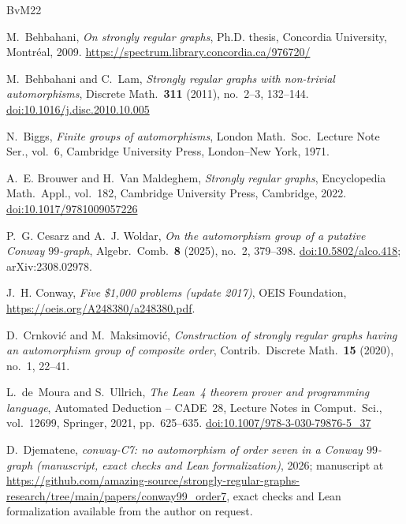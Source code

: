\documentclass[11pt,a4paper]{amsart}
\theoremstyle{definition}
\theoremstyle{remark}
\begin{document}
\begin{thebibliography}{BvM22}

 M.~Behbahani, \emph{On strongly regular graphs}, Ph.D. thesis, Concordia University,
Montréal, 2009. \url{https://spectrum.library.concordia.ca/976720/}

 M.~Behbahani and C.~Lam, \emph{Strongly regular graphs with non-trivial automorphisms},
Discrete Math.\ \textbf{311} (2011), no.~2--3, 132--144.
\href{https://doi.org/10.1016/j.disc.2010.10.005}{doi:10.1016/j.disc.2010.10.005}

 N.~Biggs, \emph{Finite groups of automorphisms}, London Math.\ Soc.\ Lecture Note Ser.,
vol.~6, Cambridge University Press, London--New York, 1971.

 A.~E. Brouwer and H.~Van Maldeghem, \emph{Strongly regular graphs}, Encyclopedia Math.\
Appl., vol.~182, Cambridge University Press, Cambridge, 2022.
\href{https://doi.org/10.1017/9781009057226}{doi:10.1017/9781009057226}

 P.~G. Cesarz and A.~J. Woldar, \emph{On the automorphism group of a putative Conway
$99$-graph}, Algebr.\ Comb.\ \textbf{8} (2025), no.~2, 379--398.
\href{https://doi.org/10.5802/alco.418}{doi:10.5802/alco.418}; arXiv:2308.02978.

 J.~H. Conway, \emph{Five \$1{,}000 problems (update 2017)}, OEIS Foundation,
\url{https://oeis.org/A248380/a248380.pdf}.

 D.~Crnković and M.~Maksimović, \emph{Construction of strongly regular graphs having an
automorphism group of composite order}, Contrib.\ Discrete Math.\ \textbf{15} (2020), no.~1, 22--41.

 L.~de~Moura and S.~Ullrich, \emph{The Lean~4 theorem prover and programming language},
Automated Deduction -- CADE~28, Lecture Notes in Comput.\ Sci., vol.~12699, Springer, 2021, pp.~625--635.
\href{https://doi.org/10.1007/978-3-030-79876-5_37}{doi:10.1007/978-3-030-79876-5\_37}

 D.~Djematene, \emph{conway-C7: no automorphism of order seven in a Conway $99$-graph (manuscript, exact checks and Lean formalization)}, 2026; manuscript at \url{https://github.com/amazing-source/strongly-regular-graphs-research/tree/main/papers/conway99_order7}, exact checks and Lean formalization available from the author on request.


\end{thebibliography}
\end{document}
